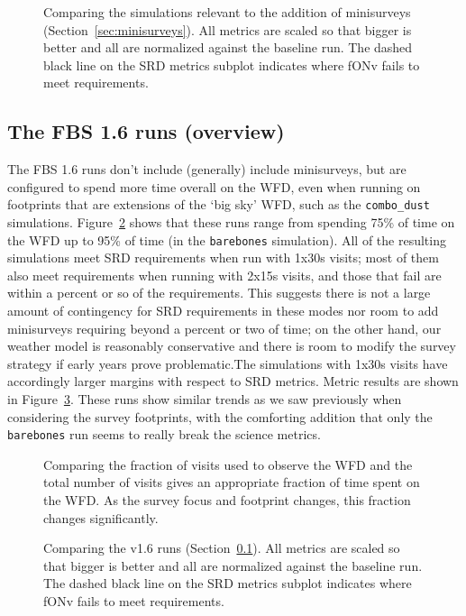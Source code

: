 \begin{figure}
\caption{Comparing the simulations relevant to the addition of minisurveys (Section~\ref{sec:minisurveys}). All metrics are scaled so that bigger is better and all are normalized against the baseline run. The dashed black line on the SRD metrics subplot indicates where fONv fails to meet requirements.}
\label{fig:minisurveys}
\end{figure}

\subsection{The FBS 1.6 runs (overview)}\label{sec:runsv16}

The FBS 1.6 runs don't include (generally) include minisurveys, but are configured to spend more time overall on the WFD, even when running on footprints that are extensions of the `big sky' WFD, such as the {\tt combo\_dust} simulations. Figure~\ref{fig:v16_wfdfraction} shows that these runs range from spending 75\% of time on the WFD up to 95\% of time (in the {\tt barebones} simulation). All of the resulting simulations meet SRD requirements when run with 1x30s visits; most of them also meet requirements when running with 2x15s visits, and those that fail are within a percent or so of the requirements. This suggests there is not a large amount of contingency for SRD requirements in these modes nor room to add minisurveys requiring beyond a percent or two of time; on the other hand, our weather model is reasonably conservative and there is room to modify the survey strategy if early years prove problematic.The simulations with 1x30s visits have accordingly larger margins with respect to SRD metrics. Metric results are shown in Figure~\ref{fig:v16}. These runs show similar trends as we saw previously when considering the survey footprints, with the comforting addition that only the {\tt barebones} run seems to really break the science metrics.

\begin{figure}
\caption{Comparing the fraction of visits used to observe the WFD and the total number of visits gives an appropriate fraction of time spent on the WFD. As the survey focus and footprint changes, this fraction changes significantly.}
\label{fig:v16_wfdfraction}
\end{figure}

\begin{figure}
\caption{Comparing the v1.6 runs (Section~\ref{sec:runsv16}). All metrics are scaled so that bigger is better and all are normalized against the baseline run. The dashed black line on the SRD metrics subplot indicates where fONv fails to meet requirements.}
\label{fig:v16}
\end{figure}
